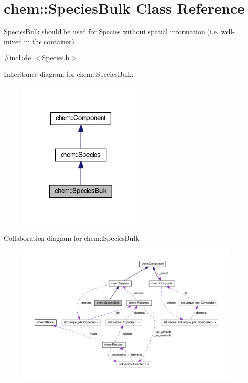 \hypertarget{classchem_1_1SpeciesBulk}{\section{chem\-:\-:Species\-Bulk Class Reference}
\label{classchem_1_1SpeciesBulk}
}


\hyperlink{classchem_1_1SpeciesBulk}{Species\-Bulk} should be used for \hyperlink{classchem_1_1Species}{Species} without spatial information (i.\-e. well-\/mixed in the container)  




{\ttfamily \#include $<$Species.\-h$>$}



Inheritance diagram for chem\-:\-:Species\-Bulk\-:
\nopagebreak
\begin{figure}[H]
\begin{center}
\leavevmode
\includegraphics[width=176pt]{classchem_1_1SpeciesBulk__inherit__graph}
\end{center}
\end{figure}


Collaboration diagram for chem\-:\-:Species\-Bulk\-:
\nopagebreak
\begin{figure}[H]
\begin{center}
\leavevmode
\includegraphics[width=350pt]{classchem_1_1SpeciesBulk__coll__graph}
\end{center}
\end{figure}
